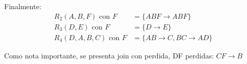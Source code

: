 \begin{itemize}
\begin{enumerate}[label=\alph*.]
        Finalmente:
        \begin{align*}
            R_2 (A,B,F) \text{ con } F &= \{ABF \rightarrow ABF \} \\
            R_3 (D,E) \text{ con } F &= \{D \rightarrow E\} \\
            R_4 (D,A,B,C) \text{ con } F &= \{AB \rightarrow C, BC \rightarrow AD\}
        \end{align*}

        Como nota importante, se presenta join con perdida, DF perdidas: $CF \rightarrow B$ 
        \vspace{.2cm}
    \end{enumerate}
    \vspace{.3cm}
    

\end{itemize}